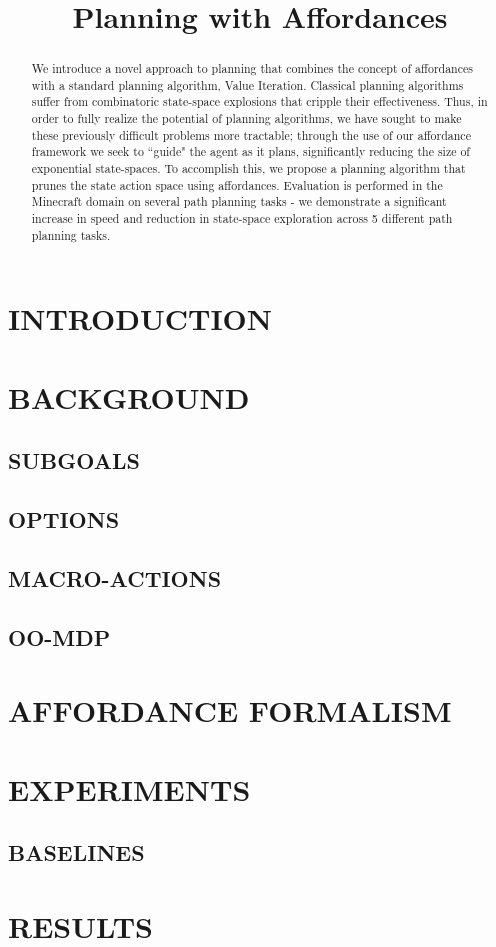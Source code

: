 
\title{Planning with Affordances}



\maketitle

\begin{abstract}
We introduce a novel approach to planning that combines the concept of affordances \cite{Gibson} with a standard planning algorithm, Value Iteration. Classical planning algorithms suffer from combinatoric state-space explosions \cite{Norvig} that cripple their effectiveness. Thus, in order to fully realize the potential of planning algorithms, we have sought to make these previously difficult problems more tractable; through the use of our affordance framework we seek to ``guide" the agent as it plans, significantly reducing the size of exponential state-spaces. To accomplish this, we propose a planning algorithm that prunes the state action space using affordances. Evaluation is performed in the Minecraft domain on several path planning tasks - we demonstrate a significant increase in speed and reduction in state-space exploration across 5 different path planning tasks.
\end{abstract}

\section{INTRODUCTION}

\section{BACKGROUND}

\subsection{SUBGOALS}

\subsection{OPTIONS}

\subsection{MACRO-ACTIONS}

\subsection{OO-MDP}

\section{AFFORDANCE FORMALISM}

\section{EXPERIMENTS}

\subsection{BASELINES}

\section{RESULTS}

